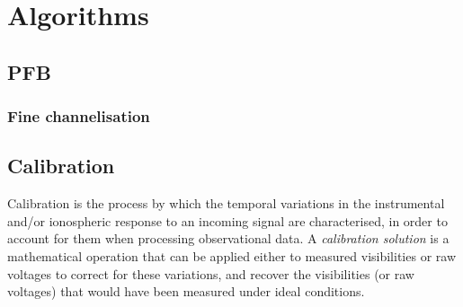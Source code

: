 \documentclass{book}
\begin{document}
\chapter{Algorithms}

\section{PFB}

\subsection{Fine channelisation}

\section{Calibration}

Calibration is the process by which the temporal variations in the instrumental and/or ionospheric response to an incoming signal are characterised, in order to account for them when processing observational data.
A \textit{calibration solution} is a mathematical operation that can be applied either to measured visibilities or raw voltages to correct for these variations, and recover the visibilities (or raw voltages) that would have been measured under ideal conditions.
\end{document}
